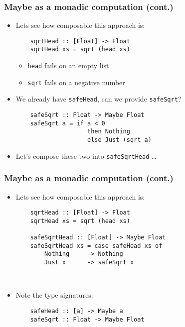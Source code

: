 \documentclass[final,handout]{beamer}
\begin{document}
\begin{frame}[fragile]
    \frametitle{Maybe as a monadic computation (cont.)}
    
    \begin{itemize}
        \item Lets see how composable this approach is:
    \begin{verbatim}
    sqrtHead :: [Float] -> Float
    sqrtHead xs = sqrt (head xs)
    \end{verbatim}
    \begin{itemize}
        \item \texttt{head} fails on an empty list
        \item \texttt{sqrt} fails on a negative number
    \end{itemize}
    
        \item<2-> We already have \texttt{safeHead}, can we provide \texttt{safeSqrt}?

    \begin{verbatim}
    safeSqrt :: Float -> Maybe Float
    safeSqrt a = if a < 0 
                    then Nothing
                    else Just (sqrt a)
    \end{verbatim}

        \item<3-> Let's compose these two into \texttt{safeSqrtHead} \dots
    \end{itemize}

\end{frame}

\begin{frame}[fragile]
    \frametitle{Maybe as a monadic computation (cont.)}
    
    \begin{itemize}
        \item Lets see how composable this approach is:
    \begin{verbatim}
    sqrtHead :: [Float] -> Float
    sqrtHead xs = sqrt (head xs)

    safeSqrtHead :: [Float] -> Maybe Float
    safeSqrtHead xs = case safeHead xs of
        Nothing     -> Nothing
        Just x      -> safeSqrt x
    \end{verbatim}

    
    ~

        \item Note the type signatures:

    \begin{verbatim}
    safeHead :: [a] -> Maybe a
    safeSqrt :: Float -> Maybe Float
    \end{verbatim}
    \end{itemize}

\end{frame}
\end{document}
